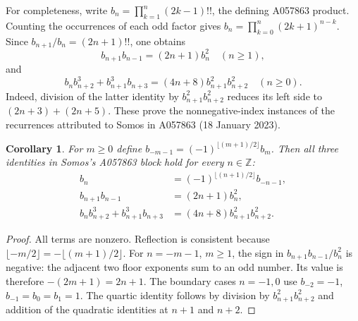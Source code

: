 \documentclass[11pt]{article}
\newtheorem{corollary}[theorem]{Corollary}
\begin{document}
For completeness, write $b_n=\prod_{k=1}^n(2k-1)!!$, the defining
A057863 product. Counting the occurrences of each odd factor gives
$b_n=\prod_{k=0}^n(2k+1)^{n-k}$. Since
$b_{n+1}/b_n=(2n+1)!!$, one obtains
\[
 b_{n+1}b_{n-1}=(2n+1)b_n^2\quad(n\ge1),
\]
and
\[
 b_nb_{n+2}^3+b_{n+1}^3b_{n+3}
 =(4n+8)b_{n+1}^2b_{n+2}^2\quad(n\ge0).
\]
Indeed, division of the latter identity by $b_{n+1}^2b_{n+2}^2$
reduces its left side to $(2n+3)+(2n+5)$. These prove the nonnegative-index
instances of the recurrences attributed to Somos in A057863 (18 January 2023).

\begin{corollary}\label{cor:integer}
For $m\ge0$ define $b_{-m-1}=(-1)^{\lfloor(m+1)/2\rfloor}b_m$.
Then all three identities in Somos's A057863 block hold for every $n\in\mathbb Z$:
\begin{align*}
 b_n&=(-1)^{\lfloor(n+1)/2\rfloor}b_{-n-1},\\
 b_{n+1}b_{n-1}&=(2n+1)b_n^2,\\
 b_nb_{n+2}^3+b_{n+1}^3b_{n+3}&=(4n+8)b_{n+1}^2b_{n+2}^2.
\end{align*}
\end{corollary}
\begin{proof}
All terms are nonzero. Reflection is consistent because
$\lfloor-m/2\rfloor=-\lfloor(m+1)/2\rfloor$.
For $n=-m-1$, $m\ge1$, the sign in
$b_{n+1}b_{n-1}/b_n^2$ is negative: the adjacent two floor exponents
sum to an odd number. Its value is therefore $-(2m+1)=2n+1$.
The boundary cases $n=-1,0$ use $b_{-2}=-1$, $b_{-1}=b_0=b_1=1$.
The quartic identity follows by division by $b_{n+1}^2b_{n+2}^2$ and
addition of the quadratic identities at $n+1$ and $n+2$.
\end{proof}
\end{document}
